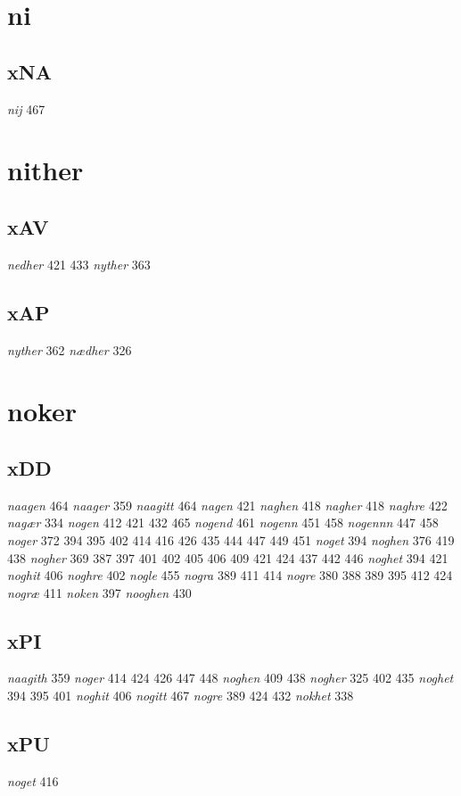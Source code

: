 \documentclass[a4paper,twocolumn]{article}
\begin{document}
\section{ni}
\label{sec:org83e568b}
\subsection{xNA}
\label{sec:org2870779}
\emph{nij} 467 
\section{nither}
\label{sec:org0310087}
\subsection{xAV}
\label{sec:org8a80488}
\emph{nedher} 421 433 \emph{nyther} 363 
\subsection{xAP}
\label{sec:orge58d752}
\emph{nyther} 362 \emph{nædher} 326 
\section{noker}
\label{sec:org0c3da7f}
\subsection{xDD}
\label{sec:org70b10e3}
\emph{naagen} 464 \emph{naager} 359 \emph{naagitt} 464 \emph{nagen} 421 \emph{naghen} 418 \emph{nagher} 418 \emph{naghre} 422 \emph{nagær} 334 \emph{nogen} 412 421 432 465 \emph{nogend} 461 \emph{nogenn} 451 458 \emph{nogennn} 447 458 \emph{noger} 372 394 395 402 414 416 426 435 444 447 449 451 \emph{noget} 394 \emph{noghen} 376 419 438 \emph{nogher} 369 387 397 401 402 405 406 409 421 424 437 442 446 \emph{noghet} 394 421 \emph{noghit} 406 \emph{noghre} 402 \emph{nogle} 455 \emph{nogra} 389 411 414 \emph{nogre} 380 388 389 395 412 424 \emph{nogræ} 411 \emph{noken} 397 \emph{nooghen} 430 
\subsection{xPI}
\label{sec:orgbec27d4}
\emph{naagith} 359 \emph{noger} 414 424 426 447 448 \emph{noghen} 409 438 \emph{nogher} 325 402 435 \emph{noghet} 394 395 401 \emph{noghit} 406 \emph{nogitt} 467 \emph{nogre} 389 424 432 \emph{nokhet} 338 
\subsection{xPU}
\label{sec:org3461230}
\emph{noget} 416 
\end{document}
